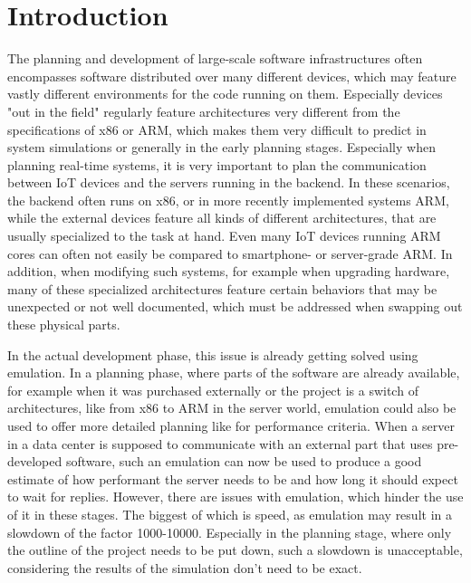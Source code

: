 
\chapter{Introduction}
The planning and development of large-scale software infrastructures often encompasses software distributed over many different devices,
which may feature vastly different environments for the code running on them.
Especially devices "out in the field" regularly feature architectures very different from the specifications of x86 or ARM,
which makes them very difficult to predict in system simulations or generally in the early planning stages.
Especially when planning real-time systems,
it is very important to plan the communication between IoT devices and the servers running in the backend.
In these scenarios, the backend often runs on x86, or in more recently implemented systems ARM,
while the external devices feature all kinds of different architectures,
that are usually specialized to the task at hand.
Even many IoT devices running ARM cores can often not easily be compared to smartphone- or server-grade ARM.
In addition, when modifying such systems, for example when upgrading hardware,
many of these specialized architectures feature certain behaviors that may be unexpected or not well documented,
which must be addressed when swapping out these physical parts.

In the actual development phase, this issue is already getting solved using emulation.
In a planning phase, where parts of the software are already available,
for example when it was purchased externally or the project is a switch of architectures,
like from x86 to ARM in the server world,
emulation could also be used to offer more detailed planning
like for performance criteria.
When a server in a data center is supposed to communicate with an external part that uses pre-developed software,
such an emulation can now be used to produce a good estimate of how performant the server needs to be and how long it should expect to wait for replies.
However, there are issues with emulation, which hinder the use of it in these stages.
The biggest of which is speed, as emulation may result in a slowdown of the factor 1000-10000\cite{slowdown}.
Especially in the planning stage, where only the outline of the project needs to be put down,
such a slowdown is unacceptable, considering the results of the simulation don't need to be exact.

